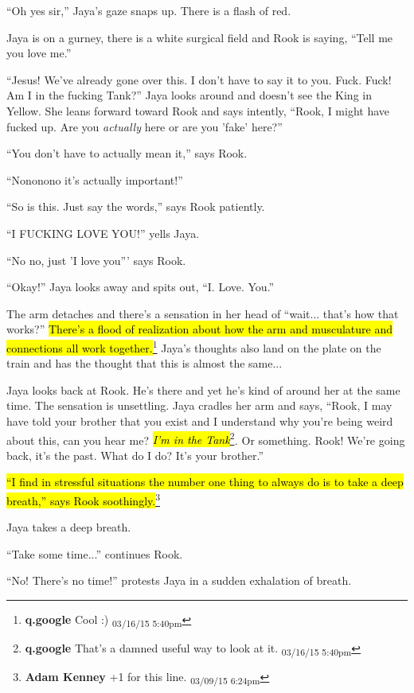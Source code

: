 ``Oh yes sir,'' Jaya's gaze snaps up.  There is a flash of red.



Jaya is on a gurney, there is a white surgical field and Rook is saying, ``Tell me you love me.''

``Jesus! We've already gone over this.  I don't have to say it to you.  Fuck. Fuck!  Am I in the fucking Tank?''  Jaya looks around and doesn't see the King in Yellow.  She leans forward toward Rook and says intently, ``Rook, I might have fucked up.  Are you \textit{actually }here or are you 'fake' here?''

``You don't have to actually mean it,'' says Rook.

``Nononono it's actually important!''

``So is this.  Just say the words,'' says Rook patiently.

``I FUCKING LOVE YOU!'' yells Jaya.

``No no, just 'I love you''' says Rook.

``Okay!'' Jaya looks away and spits out, ``I.  Love.  You.''

The arm detaches and there's a sensation in her head of ``wait... that's how that works?''  \hl{There's a flood of realization about how the arm and musculature and connections all work together.}\footnote{\textbf{q.google }Cool :) \textsubscript{03/16/15 5:40pm}} Jaya's thoughts also land on the plate on the train and has the thought that this is almost the same...

Jaya looks back at Rook.  He's there and yet he's kind of around her at the same time.  The sensation is unsettling.  Jaya cradles her arm and says, ``Rook, I may have told your brother that you exist and I understand why you're being weird about this, can you hear me?  \textit{\hl{I'm in the Tank}}\footnote{\textbf{q.google }That's a damned useful way to look at it. \textsubscript{03/16/15 5:40pm}}\textit{.} Or something. Rook!  We're going back, it's the past.  What do I do?  It's your brother.''

\hl{``I find in stressful situations the number one thing to always do is to take a deep breath,'' says Rook soothingly.}\footnote{\textbf{Adam Kenney }+1 for this line. \textsubscript{03/09/15 6:24pm}}

Jaya takes a deep breath.  

``Take some time...'' continues Rook.

``No!  There's no time!'' protests Jaya in a sudden exhalation of breath.

